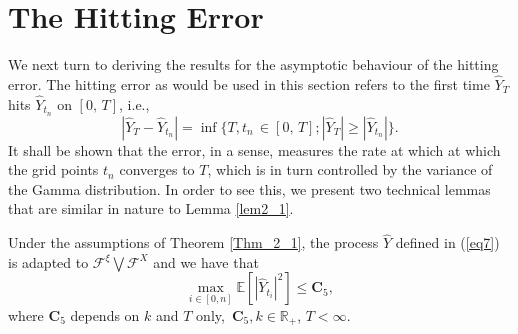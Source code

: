 \section{The Hitting Error}
We next turn to deriving the results for the asymptotic behaviour of the hitting error. The hitting error as would be used in this section refers to the first time $\hat{Y}_{T} $ hits $ \hat{Y}_{t_n}$ on $[0, \, T]$, i.e.,
\begin{equation*}
    |\hat{Y}_{T} - \hat{Y}_{t_n}| = \inf \{T, t_n \, \in [0, \, T] ; |\hat{Y}_{T}| \geq |\hat{Y}_{t_n}|\}.
\end{equation*}
It shall be shown that the error, in a sense, measures the rate at which at which the grid points $t_n$ converges to $T$, which is in turn controlled by the variance of the Gamma distribution. In order to see this, we present two technical lemmas that are similar in nature to Lemma \ref{lem2_1}.
\begin{lemma}\label{lemm3_3}
Under the assumptions of Theorem \ref{Thm_2_1}, the process $\hat{Y}$ defined in (\ref{eq7}) is adapted to $\mathcal{F}^{\xi} \bigvee \mathcal{F}^{X}$ and we have that 
\begin{equation*}
\max_{i \in [0, n]} \mathbb{E}[|\hat{Y}_{t_i}|^2] \leq \mathbf{C}_5,
\end{equation*}
where $\mathbf{C}_5$ depends on $k$ and $ T$ only, $ \, \mathbf{C}_5, k \in \mathbb{R}_+$, $T < \infty$.
\end{lemma}
